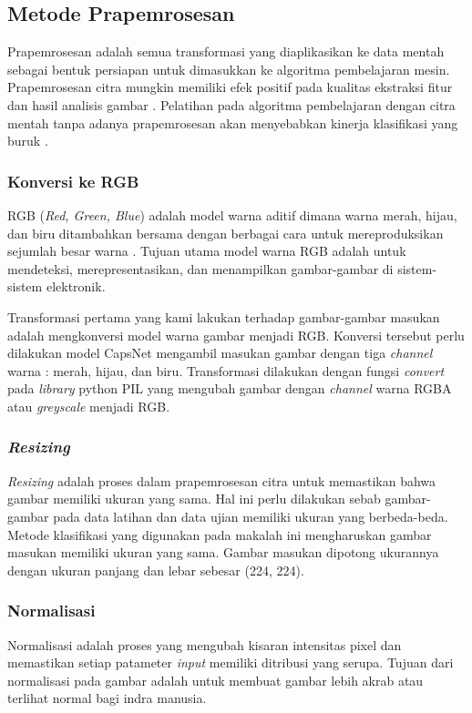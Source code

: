 \documentclass{article}
\begin{document}
    \subsection{Metode Prapemrosesan}
    Prapemrosesan adalah semua transformasi yang diaplikasikan ke data mentah sebagai bentuk persiapan untuk dimasukkan ke algoritma pembelajaran mesin. Prapemrosesan citra mungkin memiliki efek positif pada kualitas ekstraksi fitur dan hasil analisis gambar \cite{krig}. Pelatihan pada algoritma pembelajaran dengan citra mentah tanpa adanya prapemrosesan akan menyebabkan kinerja klasifikasi yang buruk \cite{pal}.
    	\subsubsection{Konversi ke RGB}
    	RGB (\textit{Red, Green, Blue}) adalah model warna aditif dimana warna merah, hijau, dan biru ditambahkan bersama dengan berbagai cara untuk mereproduksikan sejumlah besar warna \cite{robert}. Tujuan utama model warna RGB adalah untuk mendeteksi, merepresentasikan, dan menampilkan gambar-gambar di sistem-sistem elektronik.
    	\par
    	Transformasi pertama yang kami lakukan terhadap gambar-gambar masukan adalah mengkonversi model warna gambar menjadi RGB. Konversi tersebut perlu dilakukan model CapsNet mengambil masukan gambar dengan tiga \textit{channel} warna : merah, hijau, dan biru. Transformasi dilakukan dengan fungsi \textit{convert} pada \textit{library} python PIL yang mengubah gambar dengan \textit{channel} warna RGBA atau \textit{greyscale} menjadi RGB.  
    	
    	\subsubsection{\textit{Resizing}}
    	\textit{Resizing} adalah proses dalam prapemrosesan citra untuk	memastikan bahwa gambar memiliki ukuran yang sama. Hal ini perlu dilakukan sebab gambar-gambar pada data latihan dan data ujian memiliki ukuran yang berbeda-beda. Metode klasifikasi yang digunakan pada makalah ini mengharuskan gambar masukan memiliki ukuran yang sama. Gambar masukan dipotong ukurannya dengan ukuran panjang dan lebar sebesar (224, 224).
		
		\subsubsection{Normalisasi}
		Normalisasi adalah proses yang mengubah kisaran intensitas pixel dan memastikan setiap patameter \textit{input} memiliki ditribusi yang serupa. 
		Tujuan dari normalisasi pada gambar adalah untuk membuat gambar lebih akrab atau terlihat normal bagi indra manusia.\par
		
\end{document}
